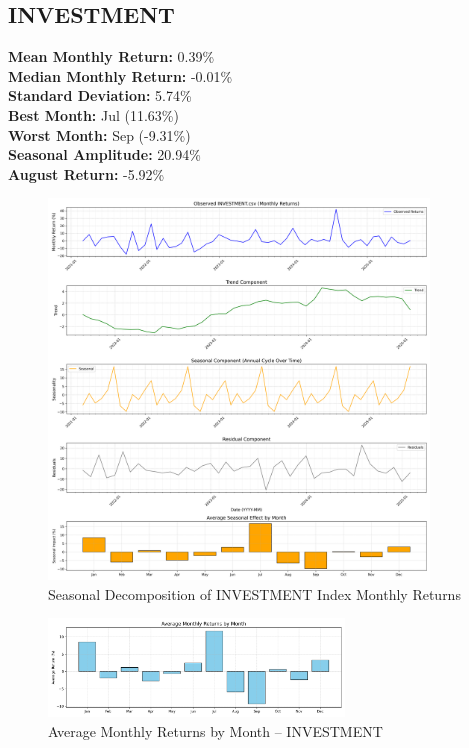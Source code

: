 \documentclass[12pt]{article}
\begin{document}
\clearpage

\subsection{INVESTMENT}
\textbf{Mean Monthly Return:} 0.39\% \\
\textbf{Median Monthly Return:} -0.01\% \\
\textbf{Standard Deviation:} 5.74\% \\
\textbf{Best Month:} Jul (11.63\%) \\
\textbf{Worst Month:} Sep (-9.31\%) \\
\textbf{Seasonal Amplitude:} 20.94\% \\
\textbf{August Return:} -5.92\% \\

\begin{figure}[h!]
    \centering
    \includegraphics[width=0.9\textwidth]{decomposition_outputs/INVESTMENT_seasonal_decomposition.png}
    \caption{Seasonal Decomposition of INVESTMENT Index Monthly Returns}
\end{figure}

\begin{figure}[h!]
    \centering
    \includegraphics[width=0.7\textwidth]{decomposition_outputs/INVESTMENT_avg_monthly_returns.png}
    \caption{Average Monthly Returns by Month -- INVESTMENT}
\end{figure}
\end{document}
